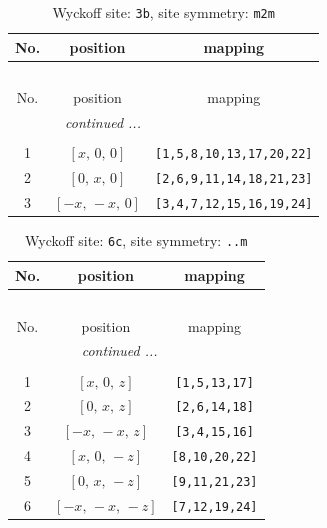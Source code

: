 \documentclass[fleqn,8pt]{jsarticle}
\begin{document}
\begin{longtable}{ccc}
\caption{Wyckoff site: {\tt 3b}, site symmetry: {\tt m2m}}
 \\
 \hline \hline
No. & position & mapping \\ \hline \endfirsthead

\multicolumn{2}{l}{\tablename\ \thetable{}} \\
 \hline \hline
No. & position & mapping \\ \hline \endhead

 \hline \hline
\multicolumn{2}{r}{\footnotesize\it continued ...} \\ \endfoot

 \hline \hline
\multicolumn{2}{r}{} \\ \endlastfoot

1 & $\left[ x,\, 0,\, 0 \right]$ & {\tt [1,5,8,10,13,17,20,22]} \\ \hline
2 & $\left[ 0,\, x,\, 0 \right]$ & {\tt [2,6,9,11,14,18,21,23]} \\ \hline
3 & $\left[ - x,\, - x,\, 0 \right]$ & {\tt [3,4,7,12,15,16,19,24]} \\
\end{longtable}
\renewcommand{\arraystretch}{1.2}
\begin{longtable}{ccc}
\caption{Wyckoff site: {\tt 6c}, site symmetry: {\tt ..m}}
 \\
 \hline \hline
No. & position & mapping \\ \hline \endfirsthead

\multicolumn{2}{l}{\tablename\ \thetable{}} \\
 \hline \hline
No. & position & mapping \\ \hline \endhead

 \hline \hline
\multicolumn{2}{r}{\footnotesize\it continued ...} \\ \endfoot

 \hline \hline
\multicolumn{2}{r}{} \\ \endlastfoot

1 & $\left[ x,\, 0,\, z \right]$ & {\tt [1,5,13,17]} \\ \hline
2 & $\left[ 0,\, x,\, z \right]$ & {\tt [2,6,14,18]} \\ \hline
3 & $\left[ - x,\, - x,\, z \right]$ & {\tt [3,4,15,16]} \\ \hline
4 & $\left[ x,\, 0,\, - z \right]$ & {\tt [8,10,20,22]} \\ \hline
5 & $\left[ 0,\, x,\, - z \right]$ & {\tt [9,11,21,23]} \\ \hline
6 & $\left[ - x,\, - x,\, - z \right]$ & {\tt [7,12,19,24]} \\
\end{longtable}
\end{document}
